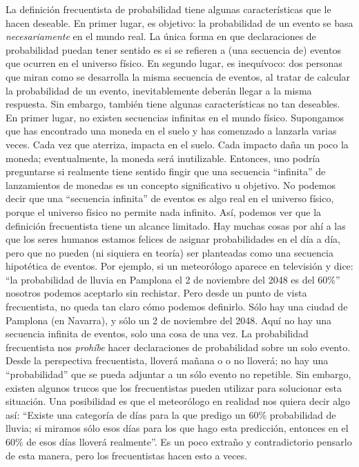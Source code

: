 \documentclass[spanish,]{book}
\begin{document}
La definición frecuentista de probabilidad tiene algunas características
que le hacen deseable. En primer lugar, es objetivo: la probabilidad de
un evento se basa \emph{necesariamente} en el mundo real. La única forma
en que declaraciones de probabilidad puedan tener sentido es si se
refieren a (una secuencia de) eventos que ocurren en el universo físico.
En segundo lugar, es inequívoco: dos personas que miran como se
desarrolla la misma secuencia de eventos, al tratar de calcular la
probabilidad de un evento, inevitablemente deberán llegar a la misma
respuesta. Sin embargo, también tiene algunas características no tan
deseables. En primer lugar, no existen secuencias infinitas en el mundo
físico. Supongamos que has encontrado una moneda en el suelo y has
comenzado a lanzarla varias veces. Cada vez que aterriza, impacta en el
suelo. Cada impacto daña un poco la moneda; eventualmente, la moneda
será inutilizable. Entonces, uno podría preguntarse si realmente tiene
sentido fingir que una secuencia ``infinita'' de lanzamientos de monedas
es un concepto significativo u objetivo. No podemos decir que una
``secuencia infinita'' de eventos es algo real en el universo físico,
porque el universo físico no permite nada infinito. Así, podemos ver que
la definición frecuentista tiene un alcance limitado. Hay muchas cosas
por ahí a las que los seres humanos estamos felices de asignar
probabilidades en el día a día, pero que no pueden (ni siquiera en
teoría) ser planteadas como una secuencia hipotética de eventos. Por
ejemplo, si un meteorólogo aparece en televisión y dice: ``la
probabilidad de lluvia en Pamplona el 2 de noviembre del 2048 es del
60\%'' nosotros podemos aceptarlo sin rechistar. Pero desde un punto de
vista frecuentista, no queda tan claro cómo podemos definirlo. Sólo hay
una ciudad de Pamplona (en Navarra), y sólo un 2 de noviembre del 2048.
Aquí no hay una secuencia infinita de eventos, solo una cosa de una vez.
La probabilidad frecuentista nos \emph{prohíbe} hacer declaraciones de
probabilidad sobre un solo evento. Desde la perspectiva frecuentista,
lloverá mañana o o no lloverá; no hay una ``probabilidad'' que se pueda
adjuntar a un sólo evento no repetible. Sin embargo, existen algunos
trucos que los frecuentistas pueden utilizar para solucionar esta
situación. Una posibilidad es que el meteorólogo en realidad nos quiera
decir algo así: ``Existe una categoría de días para la que predigo un
60\% probabilidad de lluvia; si miramos sólo esos días para los que hago
esta predicción, entonces en el 60\% de esos días lloverá realmente''.
Es un poco extraño y contradictorio pensarlo de esta manera, pero los
frecuentistas hacen esto a veces.
\end{document}

